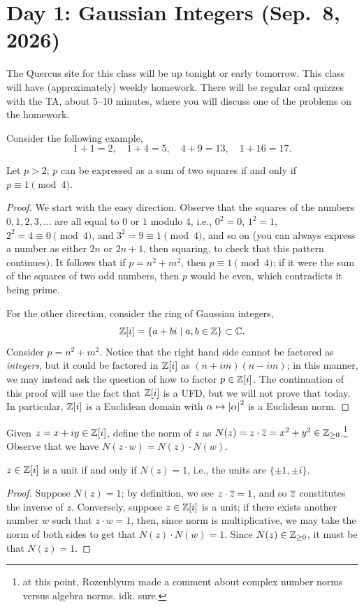 \section{Day 1: Gaussian Integers (Sep.\ 8, 2026)}
The Quercus site for this class will be up tonight or early tomorrow. This class will have (approximately) weekly homework. There will be regular oral quizzes with the TA, about 5--10 minutes, where you will discuss one of the problems on the homework.

Consider the following example,
\[ 1+1 = 2, \quad 1+4 = 5, \quad 4+9 = 13, \quad 1+16=17. \]
\vspace{-22pt}
\begin{theorem}[Fermat] \label{thm:fermat_on_two_squares}
    Let $p > 2$; $p$ can be expressed as a sum of two squares if and only if $p \equiv 1 \pmod{4}$.
\end{theorem}
\begin{proof}
    We start with the easy direction. Observe that the squares of the numbers $0, 1, 2, 3, \dots$ are all equal to $0$ or $1$ modulo $4$, i.e., $0^2 = 0$, $1^2 = 1$, $2^2 = 4 \equiv 0 \! \pmod{4}$, and $3^2 = 9 \equiv 1 \! \pmod{4}$, and so on (you can always express a number as either $2n$ or $2n + 1$, then squaring, to check that this pattern continues). It follows that if $p = n^2 + m^2$, then $p \equiv 1 \! \pmod{4}$; if it were the sum of the squares of two odd numbers, then $p$ would be even, which contradicts it being prime.

    For the other direction, consider the ring of Gaussian integers,
    \[ \mathbb Z[i] = \{a + bi \mid a, b \in \mathbb Z\} \subset \mathbb C. \]
    Consider $p = n^2 + m^2$. Notice that the right hand side cannot be factored as \textit{integers}, but it could be factored in $\mathbb Z[i]$ as $(n + im)(n - im)$; in this manner, we may instead ask the question of how to factor $p \in \mathbb Z[i]$. The continuation of this proof will use the fact that $\mathbb Z[i]$ is a UFD, but we will not prove that today. In particular, $\mathbb Z[i]$ is a Euclidean domain with $\alpha \mapsto \left\lvert \alpha \right\rvert^2$ is a Euclidean norm.
\end{proof}

Given $z = x + iy \in \mathbb Z[i]$, define the norm of $z$ as $N(z) = z \cdot \overline{z} = x^2 + y^2 \in \mathbb Z_{\geq 0}$.\footnote{at this point, Rozenblyum made a comment about complex number norms versus algebra norms. idk. sure.} Observe that we have $N(z \cdot w) = N(z) \cdot N(w)$.
\begin{claim}
    $z \in \mathbb Z[i]$ is a unit if and only if $N(z) = 1$, i.e., the units are $\{\pm 1, \pm i\}$.
\end{claim}
\begin{proof}
    Suppose $N(z) = 1$; by definition, we see $z \cdot \overline z = 1$, and so $\overline{z}$ constitutes the inverse of $z$. Conversely, suppose $z \in \mathbb Z[i]$ is a unit; if there exists another number $w$ such that $z \cdot w = 1$, then, since norm is multiplicative, we may take the norm of both sides to get that $N(z) \cdot N(w) = 1$. Since $N(z) \in \mathbb Z_{\geq 0}$, it must be that $N(z) = 1$.
\end{proof}

